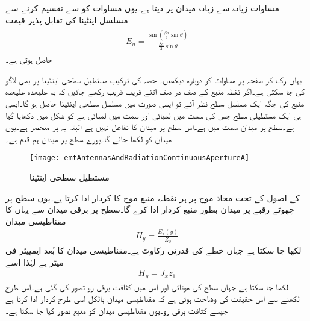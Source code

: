 مساوات  زیادہ سے زیادہ میدان  پر  دیتا ہے۔یوں مساوات  کو  سے تقسیم کرنے سے مسلسل اینٹینا کی تقابل پذیر قیمت 
\begin{gather}
\begin{aligned}\label{مساوات_اینٹینا_مسلسل_ب}
E_n=\frac{\sin \left(\frac{\beta a }{2} \sin \theta \right)}{\frac{\beta a }{2}\sin \theta}
\end{aligned}
\end{gather}
حاصل ہوتی ہے۔

یہاں رک کر صفحہ  پر مساوات  کو دوبارہ دیکھیں۔
حصہ  کی ترکیب مستطیل سطحی اینٹینا پر بھی لاگو کی جا سکتی ہے۔اگر نقطہ منبع کے صف در صف اتنے قریب قریب رکھے جائیں کہ یہ علیحدہ علیحدہ منبع کی جگہ ایک مسلسل سطح نظر آئے تو ایسی صورت میں مسلسل سطحی اینٹینا حاصل ہو گا۔ایسی ہی ایک مستطیلی سطح جس کی  سمت میں لمبائی  اور  سمت میں لمبائی  ہے کو شکل  میں دکھایا گیا ہے۔سطح پر میدان  سمت میں ہے۔اس سطح پر میدان  کا تفاعل نہیں ہے البتہ یہ  پر منحصر ہے۔یوں میدان کو  لکھا جائے گا۔پورے سطح پر میدان ہم قدم ہے۔

\begin{figure}
\centering
\texttt{[image: emtAntennasAndRadiationContinuousApertureA]}
\caption{مستطیل سطحی اینٹینا}
\label{شکل_اینٹینا_مستطیل_سطحی}
\end{figure}
 کے اصول کے تحت محاذ موج پر ہر نقطہ، منبع موج کا کردار ادا کرتا ہے۔یوں سطح پر چھوٹے رقبے   پر میدان  بطور منبع کردار ادا کرے گا۔سطح پر برقی میدان  سے یہاں کا مقناطیسی میدان
\begin{align}
H_y=\frac{E_x(y)}{Z_0}
\end{align}
لکھا جا سکتا ہے جہاں  خطے کی قدرتی رکاوٹ  ہے۔مقناطیسی میدان کا بُعد ایمپیئر فی میٹر  ہے لہٰذا اسے
\begin{align}
H_y=J_x z_1
\end{align}
لکھا جا سکتا ہے جہاں سطح کی موٹائی  اور اس میں کثافت برقی  رو  تصور کی گئی ہے۔اس طرح لکھنے سے اس حقیقت کی وضاحت ہوتی ہے کہ مقناطیسی میدان بالکل اسی طرح کردار ادا کرتا ہے جیسے کثافت برقی رو۔یوں مقناطیسی میدان کو منبع تصور کیا جا سکتا ہے۔

